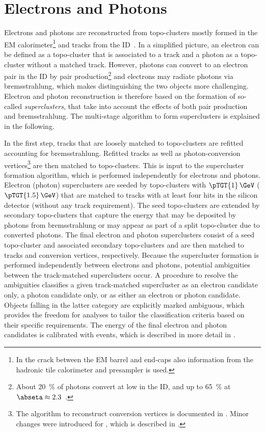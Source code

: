 \section{Electrons and Photons}
\label{sec:electron-photon-reconstruction}
Electrons and photons are reconstructed from topo-clusters mostly formed in the EM calorimeter\footnote{In the crack between the EM barrel and end-caps also information from the hadronic tile calorimeter and presampler is used.} and tracks from the ID~\cite{EGAM-2018-01}.
In a simplified picture, an electron can be defined as a topo-cluster that is associated to a track and a photon as a topo-cluster without a matched track.
However, photons can convert to an electron pair in the ID by pair production\footnote{About \SI{20}{\percent} of photons convert at low \abseta in the ID, and up to \SI{65}{\percent} at $\abseta \approx 2.3$~\cite{EGAM-2018-01}.} and electrons may radiate photons via bremsstrahlung, which makes distinguishing the two objects more challenging. Electron and photon reconstruction is therefore based on the formation of so-called \emph{superclusters}, that take into account the effects of both pair production and bremsstrahlung. The multi-stage algorithm to form superclusters is explained in the following.

In the first step, tracks that are loosely matched to topo-clusters are refitted accounting for bremsstrahlung. Refitted tracks as well as photon-conversion vertices\footnote{The algorithm to reconstruct conversion vertices is documented in . Minor changes were introduced for \RunTwo, which is described in .} are then matched to topo-clusters.
This is input to the supercluster formation algorithm, which is performed independently for electrons and photons.
Electron (photon) superclusters are seeded by topo-clusters with $\pTGT{1}\,\GeV$ ($\pTGT{1.5}\,\GeV$) that are matched to tracks with at least four hits in the silicon detector (without any track requirement).
The seed topo-clusters are extended by secondary topo-clusters that capture the energy that may be deposited by photons from bremsstrahlung or may appear as part of a split topo-cluster due to converted photons.
The final electron and photon superclusters consist of a seed topo-cluster and associated secondary topo-clusters and are then matched to tracks and conversion vertices, respectively.
Because the supercluster formation is performed independently between electrons and photons, potential ambiguities between the track-matched superclusters occur. A procedure to resolve the ambiguities classifies a given track-matched supercluster as an electron candidate only, a photon candidate only, or as either an electron or photon candidate.
Objects falling in the latter category are explicitly marked ambiguous, which provides the freedom for analyses to tailor the classification criteria based on their specific requirements.
The energy of the final electron and photon candidates is calibrated with \Zee events, which is described in more detail in .

